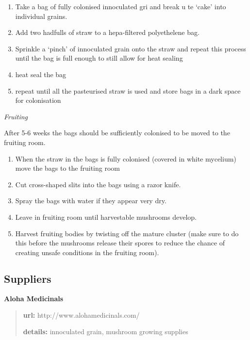 \begin{enumerate}
\def\labelenumi{\arabic{enumi}.}
\itemsep1pt\parskip0pt
\item
  Take a bag of fully colonised innoculated gri and break u te `cake'
  into individual grains.
\item
  Add two hadfulls of straw to a hepa-filtered polyethelene bag.
\item
  Sprinkle a `pinch' of innoculated grain onto the straw and repeat this
  process until the bag is full enough to still allow for heat sealing
\item
  heat seal the bag
\item
  repeat until all the pasteurised straw is used and store bags in a
  dark space for colonisation
\end{enumerate}

\emph{Fruiting}

After 5-6 weeks the bags should be sufficiently colonised to be moved to
the fruiting room.

\begin{enumerate}
\def\labelenumi{\arabic{enumi}.}
\itemsep1pt\parskip0pt
\item
  When the straw in the bags is fully colonised (covered in white
  mycelium) move the bags to the fruiting room
\item
  Cut cross-shaped slits into the bags using a razor knife.
\item
  Spray the bags with water if they appear very dry.
\item
  Leave in fruiting room until harvestable mushrooms develop.
\item
  Harvest fruiting bodies by twisting off the mature cluster (make sure
  to do this before the mushrooms release their spores to reduce the
  chance of creating unsafe conditions in the fruiting room).
\end{enumerate}

\subsection{Suppliers}\label{suppliers}

\textbf{Aloha Medicinals}

\begin{quote}
\textbf{url:} http://www.alohamedicinals.com/

\textbf{details:} innoculated grain, mushroom growing supplies
\end{quote}

